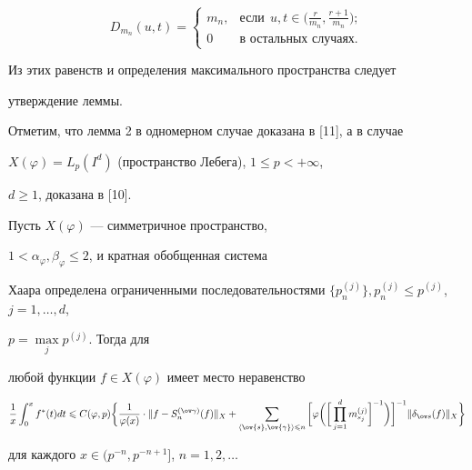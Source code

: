 $$


D_{m_{n}}(u,t)=


\begin{cases}


m_{n}, & \text{если} \ \ u,t\in\big(\frac{r}{m_{n}}, 


\frac{r+1}{m_{n}}\big);\\


0 & \text{в остальных случаях}.


\end{cases}


$$


Из этих равенств и определения максимального пространства следует 


утверждение леммы.





Отметим, что лемма 2 в одномерном случае доказана в [11], а в случае   


$X(\varphi)=L_{p}(I^{d})$ (пространство Лебега), $1\leq p<+\infty$,


$d\geq 1$, доказана в [10].








\begin{lem}


Пусть $X(\varphi)$ --- симметричное пространство,  


$1<\alpha_{\varphi},\beta_{\varphi}\leq 2$, и кратная обобщенная система 


Хаара определена ограниченными последовательностями $\{p_{n}^{(j)}\},


p_{n}^{(j)}\leq p^{(j)}$, $j=1,\dotsc,d$,


$p=\max\limits_{j}p^{(j)}$. Тогда для 


любой функции  $f\in X(\varphi)$ имеет место неравенство


$$


\frac{1}{x}\int_{0}^{x}f^{*}(t)dt\leq 


C(\varphi,p)\bigg\{\frac{1}{\varphi(x)}\cdot 


\|f-S_{n}^{(\ov\gamma)}(f)\|_{X}+\sum_{\la\ov{s},\ov{\gamma}\ra\leq 


n}\bigg[\varphi\bigg(\bigg[\prod_{j=1}^{d}m_{s_{j}}^{(j)}\bigg]^{-1} 


\bigg)\bigg]^{-1}\|\delta_{\ov s}(f)\|_{X}\bigg\}


$$


для каждого $x\in (p^{-n},p^{-n+1}]$, $n=1,2,\dotsc$ 


\end{lem}





